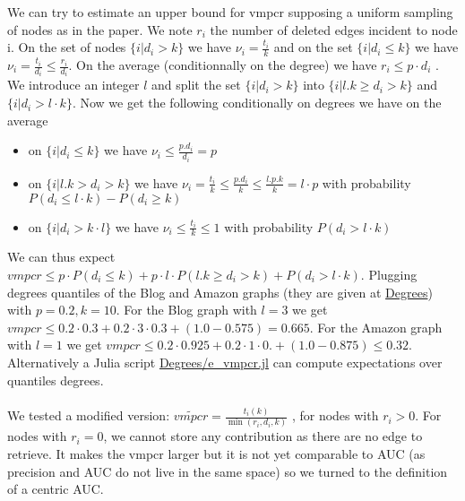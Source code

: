 \documentclass{article}
\begin{document}
We can try to estimate an upper bound for vmpcr supposing a uniform sampling of nodes as in the paper.
We note $r_{i}$ the number of deleted edges incident to node i.
On the set of nodes $\{i | d_{i} > k\}$ we have $ \nu_{i} = \frac{t_{i}}{k} $ and on the set $\{i | d_{i} \leq k\}$  we have  $ \nu_{i} = \frac{t_{i}}{d_{i}} \leq \frac{r_{i}}{d_{i}}$.
On the average (conditionnally on the degree) we have $ r_{i} \leq p \cdot d_{i} $ . We introduce an integer $l$ and split the set $ \{ i | d_{i} > k  \}$ into  $ \{ i | l . k \ge d_{i} > k  \}$ and $ \{ i |  d_{i} > l \cdot k \}$. Now we get the following conditionally on degrees we have on the average
\begin{itemize}
    \item  on $\{i | d_{i} \leq k\}$ we have $ \nu_{i} \leq \frac{p . d_{i}}{d_{i}} = p$
    \item on  $ \{ i | l . k > d_{i} > k  \}$ we have $ \nu_{i} = \frac{t_{i}}{k} \leq \frac{p.d_{i}}{k} \leq \frac{l.p.k}{k} = l \cdot p $ with probability $P(d_{i} \leq l \cdot k) - P(d_{i} \geq k)$
    \item on $\{i| d_{i} > k \cdot l \}$  we have $ \nu_{i} \leq \frac{t_{i}}{k} \leq 1 $ with probability $ P(d_{i} > l \cdot k) $
\end{itemize}

We can thus expect $ vmpcr \leq p \cdot P(d_{i} \leq k) + p \cdot l \cdot P(l . k \geq d_{i} > k ) + P(d_{i} > l \cdot k)$.
Plugging degrees quantiles of the Blog and Amazon graphs (they are given at  \href{https://github.com/jean-pierreBoth/linkauc}{\color{blue}Degrees})
with $p=0.2, k=10$. For the Blog graph with $l=3$ we get $vmpcr \leq  0.2 \cdot 0.3 + 0.2 \cdot 3 \cdot 0.3 + (1.0-0.575) = 0.665$.
For the Amazon graph with $l = 1$ we get $ vmpcr \leq 0.2 \cdot 0.925 + 0.2 \cdot 1 \cdot 0. + (1.0-0.875) \leq 0.32$.
Alternatively a Julia script \href{https://github.com/jean-pierreBoth/linkauc}{\color{blue}Degrees/e\_vmpcr.jl} can compute expectations over quantiles degrees.

\paragraph{}

We tested  a modified version: $ \widetilde{vmpcr} = \frac{t_{i}(k)}{\min(r_{i}, d_{i}, k)}$ , for nodes with $ r_{i} > 0 $. For nodes with $ r_{i} = 0 $, we cannot store any contribution as there are no edge to retrieve.
It makes the vmpcr larger but it is not yet comparable to AUC (as precision and AUC do not live in the same space) so we turned to the definition of a centric AUC.
\end{document}
